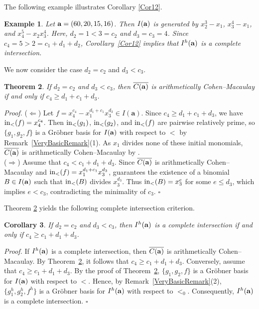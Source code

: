 \documentclass[10pt]{amsart}
\newtheorem{thm1}{Theorem}[section]
\newtheorem{cor1}[thm1]{Corollary}
\newtheorem{ex1}[thm1]{Example}
\begin{document}
The following example illustrates Corollary \ref{Cor12}.

\begin{ex1} {\rm Let ${\bf a}=(60, 20, 15, 16)$. Then $I({\bf a})$ is generated by $x_{2}^3-x_1$, $x_{3}^{4}-x_{1}$, and $x_{4}^{5}-x_{2}x_{3}^4$. Here, $d_2=1<3=c_2$ and $d_3=c_3=4$. Since $c_4=5>2=c_1+d_1+d_2$, Corollary~\ref{Cor12} implies that
$I^{h}({\bf a})$ is a complete intersection.}
\end{ex1}

We now consider the case $d_2=c_2$ and $d_3<c_3$.

\begin{thm1} \label{ACM6} If $d_2=c_{2}$ and $d_{3}<c_3$, then $\overline{C({\bf a})}$ is arithmetically Cohen--Macaulay if and only if $c_{4} \geq d_1+c_1+d_{3}$.
\end{thm1}

{\em \noindent Proof.} ($\Leftarrow$) Let $f=x_{4}^{c_4}-x_{1}^{d_1+c_1}x_{3}^{d_3}\in I(\mathbf a)$. Since $c_{4} \geq d_1+c_1+d_{3}$, we have ${\rm in}_{<}(f)=x_{4}^{c_4}$.
Then ${\rm in}_{<}(g_1)$, ${\rm in}_{<}(g_2)$, and ${\rm in}_{<}(f)$ are pairwise relatively prime, so $\{g_1, g_2, f\}$ is a Gr\"obner basis for $I({\bf a})$ with respect to $<$ by Remark~\ref{VeryBasicRemark}(1). As $x_1$ divides none of these initial monomials, $\overline{C({\bf a})}$ is arithmetically Cohen--Macaulay by \cite[Theorem 2.2]{HerSta}.\\
($\Rightarrow$) Assume that $c_{4}<c_1+d_{1}+d_{3}$. Since $\overline{C({\bf a})}$ is arithmetically Cohen--Macaulay and ${\rm in}_{<}(f)=x_{1}^{d_1+c_1}x_{3}^{d_3}$, \cite[Theorem 2.2]{HerSta} guarantees the existence of a binomial $B \in I({\bf a})$ such that ${\rm in}_{<}(B)$ divides $x_{3}^{d_3}$. Thus ${\rm in}_{<}(B)=x_{3}^{e}$ for some $e \leq d_3$, which implies $e<c_3$, contradicting the minimality of $c_3$. \hfill $\square$ \par\vspace{0.5\baselineskip}

Theorem \ref{ACM6} yields the following complete intersection criterion.

\begin{cor1} \label{Cor13} If $d_2=c_{2}$ and $d_{3}<c_3$, then $I^{h}({\bf a})$ is a complete intersection if and only if $c_{4} \geq c_1+d_{1}+d_{3}$.
\end{cor1}

{\em \noindent Proof.} If $I^{h}({\bf a})$ is a complete intersection, then $\overline{C({\bf a})}$ is arithmetically Cohen--Macaulay. By Theorem~\ref{ACM6}, it follows that $c_4 \ge c_1+d_1+d_3$. Conversely, assume that $c_{4} \geq c_1+d_{1}+d_{3}$. By the proof of Theorem~\ref{ACM6}, $\{g_1,g_2,f\}$ is a Gr\"obner basis for $I({\bf a})$ with respect to $<$. Hence, by Remark~\ref{VeryBasicRemark}(2), $\{g_1^{h},g_2^{h},f^{h}\}$ is a Gr\"obner basis for $I^{h}({\bf a})$ with respect to $<_0$. Consequently, $I^{h}({\bf a})$ is a complete intersection. \hfill $\square$ \par\vspace{0.5\baselineskip}
\end{document}
